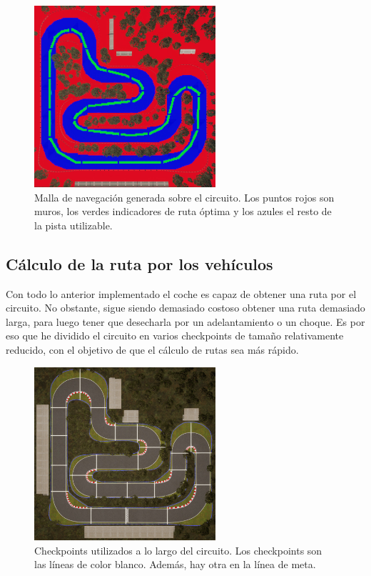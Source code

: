 \begin{itemize}
    \begin{figure}[H]
        \centering
        \includegraphics[width=0.6\textwidth]{imagenes/converted/malla.jpg}
        \caption{Malla de navegación generada sobre el circuito. Los puntos rojos son muros, los verdes indicadores de ruta óptima y los azules el resto de la pista utilizable.}
        \label{fig:mallanav}
    \end{figure}
\end{itemize}


\subsection{Cálculo de la ruta por los vehículos}

Con todo lo anterior implementado el coche es capaz de obtener una ruta por el circuito. No obstante, sigue siendo demasiado costoso obtener una ruta demasiado larga, para luego tener que desecharla por un adelantamiento o un choque. Es por eso que he dividido el circuito en varios checkpoints de tamaño relativamente reducido, con el objetivo de que el cálculo de rutas sea más rápido.


\begin{figure}[H]
    \centering
    \includegraphics[width=0.6\textwidth]{imagenes/converted/checkpoints.jpg}
    \caption{Checkpoints utilizados a lo largo del circuito. Los checkpoints son las líneas de color blanco. Además, hay otra en la línea de meta.}
    \label{fig:checkpointunreal}
\end{figure}

